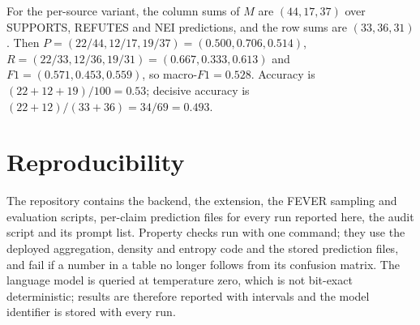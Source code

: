 \documentclass[11pt,a4paper]{article}
\begin{document}
For the per-source variant, the column sums of $M$ are $(44, 17, 37)$ over SUPPORTS, REFUTES and NEI predictions, and the row sums are $(33, 36, 31)$. Then $P = (22/44, 12/17, 19/37) = (0.500, 0.706, 0.514)$, $R = (22/33, 12/36, 19/31) = (0.667, 0.333, 0.613)$ and $F1 = (0.571, 0.453, 0.559)$, so macro-$F1 = 0.528$. Accuracy is $(22+12+19)/100 = 0.53$; decisive accuracy is $(22+12)/(33+36) = 34/69 = 0.493$.

\section{Reproducibility}

The repository contains the backend, the extension, the FEVER sampling and evaluation scripts, per-claim prediction files for every run reported here, the audit script and its prompt list. Property checks run with one command; they use the deployed aggregation, density and entropy code and the stored prediction files, and fail if a number in a table no longer follows from its confusion matrix. The language model is queried at temperature zero, which is not bit-exact deterministic; results are therefore reported with intervals and the model identifier is stored with every run.
\end{document}
